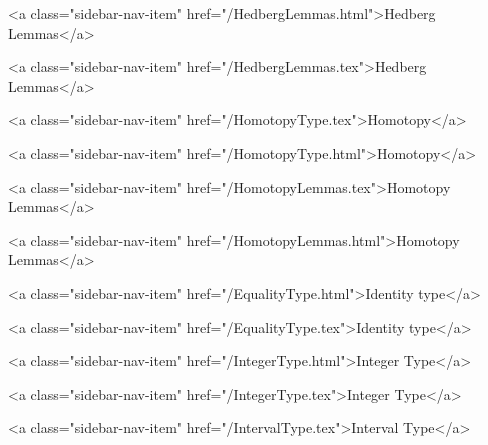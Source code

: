       
    
      
        
          <a class="sidebar-nav-item" href="/HedbergLemmas.html">Hedberg Lemmas</a>
        
      
    
      
        
          <a class="sidebar-nav-item" href="/HedbergLemmas.tex">Hedberg Lemmas</a>
        
      
    
      
        
          <a class="sidebar-nav-item" href="/HomotopyType.tex">Homotopy</a>
        
      
    
      
        
          <a class="sidebar-nav-item" href="/HomotopyType.html">Homotopy</a>
        
      
    
      
        
          <a class="sidebar-nav-item" href="/HomotopyLemmas.tex">Homotopy Lemmas</a>
        
      
    
      
        
          <a class="sidebar-nav-item" href="/HomotopyLemmas.html">Homotopy Lemmas</a>
        
      
    
      
        
          <a class="sidebar-nav-item" href="/EqualityType.html">Identity type</a>
        
      
    
      
        
          <a class="sidebar-nav-item" href="/EqualityType.tex">Identity type</a>
        
      
    
      
        
          <a class="sidebar-nav-item" href="/IntegerType.html">Integer Type</a>
        
      
    
      
        
          <a class="sidebar-nav-item" href="/IntegerType.tex">Integer Type</a>
        
      
    
      
        
          <a class="sidebar-nav-item" href="/IntervalType.tex">Interval Type</a>
        
